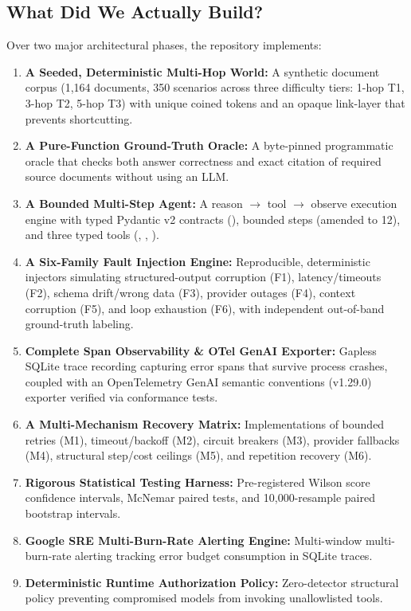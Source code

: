 \subsection{What Did We Actually Build?}
Over two major architectural phases, the repository implements:
\begin{enumerate}
    \item \textbf{A Seeded, Deterministic Multi-Hop World:} A synthetic document corpus (1,164 documents, 350 scenarios across three difficulty tiers: 1-hop T1, 3-hop T2, 5-hop T3) with unique coined tokens and an opaque link-layer that prevents shortcutting.
    \item \textbf{A Pure-Function Ground-Truth Oracle:} A byte-pinned programmatic oracle that checks both answer correctness and exact citation of required source documents without using an LLM.
    \item \textbf{A Bounded Multi-Step Agent:} A reason $\to$ tool $\to$ observe execution engine with typed Pydantic v2 contracts (), bounded steps (amended to 12), and three typed tools (, , ).
    \item \textbf{A Six-Family Fault Injection Engine:} Reproducible, deterministic injectors simulating structured-output corruption (F1), latency/timeouts (F2), schema drift/wrong data (F3), provider outages (F4), context corruption (F5), and loop exhaustion (F6), with independent out-of-band ground-truth labeling.
    \item \textbf{Complete Span Observability \& OTel GenAI Exporter:} Gapless SQLite trace recording capturing error spans that survive process crashes, coupled with an OpenTelemetry GenAI semantic conventions (v1.29.0) exporter verified via conformance tests.
    \item \textbf{A Multi-Mechanism Recovery Matrix:} Implementations of bounded retries (M1), timeout/backoff (M2), circuit breakers (M3), provider fallbacks (M4), structural step/cost ceilings (M5), and repetition recovery (M6).
    \item \textbf{Rigorous Statistical Testing Harness:} Pre-registered Wilson score confidence intervals, McNemar paired tests, and 10,000-resample paired bootstrap intervals.
    \item \textbf{Google SRE Multi-Burn-Rate Alerting Engine:} Multi-window multi-burn-rate alerting tracking error budget consumption in SQLite traces.
    \item \textbf{Deterministic Runtime Authorization Policy:} Zero-detector structural policy preventing compromised models from invoking unallowlisted tools.
\end{enumerate}

